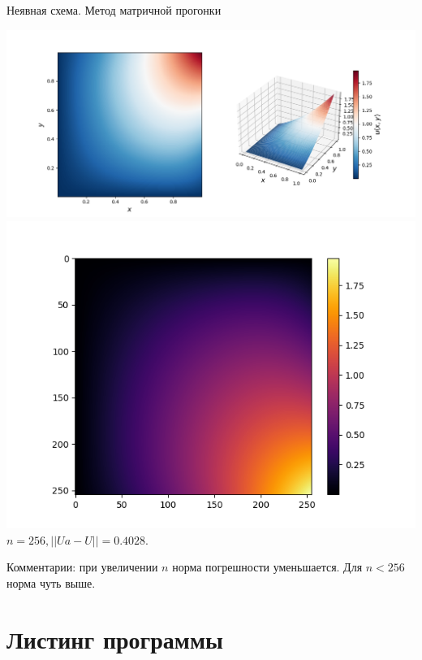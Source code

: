 \documentclass[a4paper, 12pt]{article}
\begin{document}
	\newpage
	Неявная схема. Метод матричной прогонки
	\begin{center}		
		\includegraphics[scale=0.5]{plot2_1.png} \\
		\includegraphics[scale=0.6]{plot2_2.png} \\
		 $n = 256, ||Ua - U|| = 0.4028$.
	\end{center}
	Комментарии: при увеличении $n$ норма погрешности уменьшается. Для $n < 256$ норма чуть выше.
	
	\newpage
	\section{Листинг программы}
\end{document}
